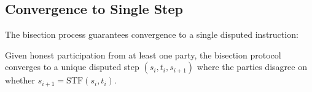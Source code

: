 \subsection{Convergence to Single Step}

The bisection process guarantees convergence to a single disputed instruction:

\begin{lemma}
Given honest participation from at least one party, the bisection protocol converges to a unique disputed step $(s_i, t_i, s_{i+1})$ where the parties disagree on whether $s_{i+1} = \text{STF}(s_i, t_i)$.
\end{lemma}

